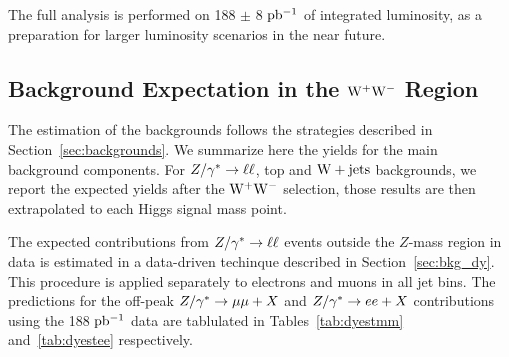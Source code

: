 The full analysis is performed on 188 $\pm$ 8 $\mathrm{pb^{-1}}$ of integrated luminosity, as a 
preparation for larger luminosity scenarios in the near future.

\subsection{Background Expectation in the $\mathrm{W}^+\mathrm{W}^-$ Region}
The estimation of the backgrounds follows the strategies described in 
Section~\ref{sec:backgrounds}. We summarize here the yields for the main background
components. For $Z/\gamma^*\to\ell\ell$, top and $\mathrm{W+jets}$ backgrounds, we report the 
expected yields after the $\mathrm{W}^+\mathrm{W}^-$ selection, those results are then extrapolated 
to each Higgs signal mass point.

The expected contributions from $Z/\gamma^*\to\ell\ell$ events outside the $Z$-mass region in data 
is estimated in a data-driven techinque described in Section~\ref{sec:bkg_dy}. 
This procedure is applied separately to electrons and muons in all jet bins. 
The predictions for the off-peak $Z/\gamma^*\to\mu\mu+X$ and $Z/\gamma^*\to ee+X$ contributions 
using the 188 $\mathrm{pb^{-1}}$ data are tablulated in Tables~\ref{tab:dyestmm} and~\ref{tab:dyestee} respectively. 

